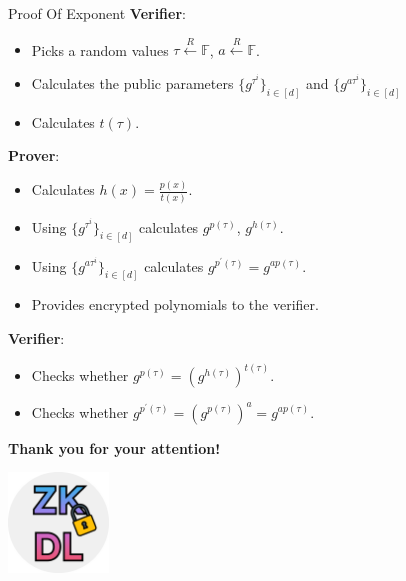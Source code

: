 \documentclass{zkdl-presentation-template}
\begin{document}
    \begin{frame}{Proof Of Exponent}
        \textbf{Verifier}: 
        \vspace{-5pt}
        \begin{itemize}[label=]
            \item \vspace{-3pt} Picks a random values $\tau \xleftarrow{R} \mathbb{F}$, $a \xleftarrow{R} \mathbb{F}$. \pause
            \item \vspace{-3pt} Calculates the public parameters $\{g^{\tau^i}\}_{i \in [d]}$ and $\{g^{a\tau^i}\}_{i \in [d]}$ \pause
            \item \vspace{-3pt} Calculates $t(\tau)$. \pause
        \end{itemize}
        \textbf{Prover}: 
        \vspace{-5pt}
        \begin{itemize}[label=]
            \item \vspace{-3pt} Calculates $h(x) = \frac{p(x)}{t(x)}$. \pause
            \item \vspace{-3pt} Using $\{g^{\tau^i}\}_{i \in [d]}$ calculates $g^{p(\tau)}$, $g^{h(\tau)}$. \pause
            \item \vspace{-3pt} Using $\{g^{a\tau^i}\}_{i \in [d]}$ calculates $g^{p^{\prime}(\tau)} = g^{ap(\tau)}$. \pause
            \item \vspace{-3pt} Provides encrypted polynomials to the verifier. \pause
        \end{itemize}
        \textbf{Verifier}: 
        \vspace{-5pt}
        \begin{itemize}[label=]
            \item \vspace{-3pt} Checks whether $g^{p(\tau)} = \left( g^{h(\tau)} \right)^{t(\tau)}$. \pause
            \item \vspace{-3pt} Checks whether $g^{p^{\prime}(\tau)} = \left( g^{p(\tau)} \right)^{a} = g^{ap(\tau)}$. 
        \end{itemize}
    \end{frame}

    \begin{frame}
        \centering
        \huge
        \textbf{Thank you for your attention!} \\
    
        \begin{center}
            \includegraphics[width=0.2\textwidth]{images/logo.png}
        \end{center}
    \end{frame}
\end{document}
